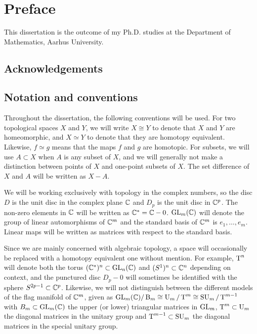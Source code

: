 \chapter{Preface} 



This dissertation is the outcome of my Ph.D. studies at the Department
of Mathematics, Aarhus University. 

\section{Acknowledgements}

\section{Notation and conventions}

Throughout the dissertation, the following conventions will be used.
For two topological spaces $X$ and $Y$, we will write $X \cong Y$ to
denote that $X$ and $Y$ are homeomorphic, and $X\simeq Y$ to denote
that they are homotopy equivalent. Likewise, $f \simeq g$ means that
the maps $f$ and $g$ are homotopic. For subsets, we will use $A
\subset X$ when $A$ is any subset of $X$, and we will generally not
make a distinction between points of $X$ and one-point subsets of
$X$. The set difference of $X$ and $A$ will be written as $X-A$.

We will be working exclusively with topology in the complex numbers,
so the disc $D$ is the unit disc in the complex plane $\mathbb{C}$ and $D_p$
is the unit disc in $\mathbb{C}^p$. The non-zero elements in $\mathbb{C}$ will be
written as $\mathbb{C}^* = \mathbb{C} - 0$. $\operatorname{GL}_m(\mathbb{C})$ will denote the group of
linear automorphisms of $\mathbb{C}^m$ and the standard basis of $\mathbb{C}^m$ is
$e_1,\dots,e_m$. Linear maps will be written as matrices with respect
to the standard basis.

Since we are mainly concerned with algebraic topology, a space will
occasionally be replaced with a homotopy equivalent one without
mention. For example, $\operatorname{T}^n$ will denote both the torus $(\mathbb{C}^*)^n
\subset \operatorname{GL}_n(\mathbb{C})$ and $(S^1)^n\subset \mathbb{C}^n$ depending on context, and
the
punctured disc $D_p-0$ will sometimes be identified with the sphere
$S^{2p-1} \subset \mathbb{C}^p$. Likewise, we will not distinguish between the
different models of the flag manifold of $\mathbb{C}^m$, given as $\operatorname{GL}_{m}(\mathbb{C})/\operatorname{B}_{m}
\cong \operatorname{U}_{m}/\operatorname{T}^{m} \cong \operatorname{SU}_{m}/\operatorname{T}^{m-1}$ with $B_m \subset \operatorname{GL}_m(\mathbb{C})$ the upper (or
lower) triangular matrices in $\operatorname{GL}_m$, $\operatorname{T}^m \subset \operatorname{U}_m$ the diagonal
matrices in the unitary group and $\operatorname{T}^{m-1}\subset \operatorname{SU}_m$ the diagonal
matrices in the special unitary group.

